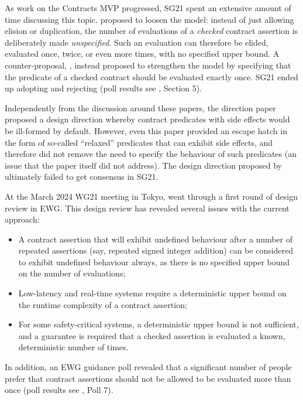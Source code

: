 As work on the Contracts MVP progressed, SG21 spent an extensive amount of time discussing this topic. \cite{P2751R1} proposed to loosen the \cite{P2521R5} model: instead of just allowing elision or duplication, the number of evaluations of a \emph{checked} contract assertion is deliberately made \emph{unspecified}. Such an evaluation can therefore be elided, evaluated once, twice, or even more times, with no specified upper bound. A counter-proposal, \cite{P2756R0}, instead proposed to strengthen the \cite{P2521R5} model by specifying that the predicate of a checked contract should be evaluated exactly once. SG21 ended up adopting  \cite{P2751R1} and rejecting \cite{P2756R0} (poll results see \cite{P2751R1}, Section 5).

Independently from the discussion around these papers, the direction paper \cite{P2680R1} proposed a design direction whereby contract predicates with side effects would be ill-formed by default. However, even this paper provided an escape hatch in the form of so-called ``relaxed'' predicates that can exhibit side effects, and therefore did not remove the need to specify the behaviour of such predicates (an issue that the paper itself did not address). The design direction proposed by \cite{P2680R1} ultimately failed to get consensus in SG21.

At the March 2024 WG21 meeting in Tokyo, \cite{P2900R6}  went through a first round of design review in EWG. This design review has revealed several issues with the current approach:
\begin{itemize}
\item A contract assertion that will exhibit undefined behaviour after a number of repeated assertions (say, repeated signed integer addition) can be considered to exhibit undefined behaviour always, as there is no specified upper bound on the number of evaluations;
\item Low-latency and real-time systems require a deterministic upper bound on the runtime complexity of a contract assertion;
\item For some safety-critical systems, a deterministic upper bound is not sufficient, and a guarantee is required that a checked assertion is evaluated a known, deterministic number of times.
\end{itemize} 

In addition, an EWG guidance poll revealed that a significant number of people prefer that contract assertions should not be allowed to be evaluated more than once (poll results see \cite{D3197R0}, Poll 7).  

